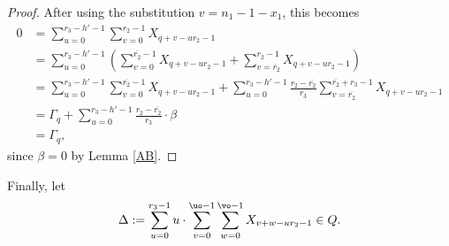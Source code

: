 \begin{proof}
After using the substitution $v=n_1-1-x_1$, this becomes
\begin{align*}
0&=\sum_{u=0}^{r_3-h'-1} \sum_{v=0}^{r_2-1} X_{q+v-ur_2-1}\\
&=\sum_{u=0}^{r_3-h'-1} \left(\sum_{v=0}^{\overline{r_2}-1} X_{q+v-ur_2-1}+\sum_{v=\overline{r_2}}^{r_2-1} X_{q+v-ur_2-1}\right)\\
&=\sum_{u=0}^{r_3-h'-1} \sum_{v=0}^{\overline{r_2}-1} X_{q+v-ur_2-1}+\sum_{u=0}^{r_3-h'-1}\frac{r_2-\overline{r_2}}{r_3}\sum_{v=\overline{r_2}}^{\overline{r_2}+r_3-1} X_{q+v-ur_2-1}\\
&=\Gamma_q+\sum_{u=0}^{r_3-h'-1}\frac{r_2-\overline{r_2}}{r_3}\cdot \beta\\
&=\Gamma_q,
\end{align*}
since $\beta=0$ by Lemma \ref{AB}.
\end{proof}

Finally, let 
\begin{equation}\label{Delta}
\Delta:=\sum_{u=0}^{r_3-1}u\cdot\sum_{v=0}^{\uo-1} \sum _{w=0}^{\vo-1} X_{v+w-ur_2-1}\in Q.
\end{equation}

